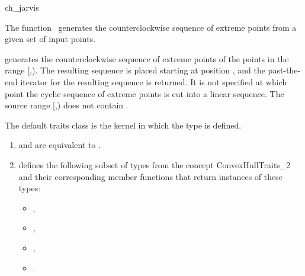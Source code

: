 
\begin{ccRefFunction}{ch_jarvis}  %

\ccDefinition
  
The function \ccRefName\ generates the counterclockwise sequence of extreme
points from a given set of input points.



            {generates the counterclockwise sequence of extreme points
            of the points in the range [,).
            The resulting sequence is placed starting at position
            , and the past-the-end iterator for the resulting
            sequence is returned. It is not specified at which point the
            cyclic sequence of extreme points is cut into a linear sequence.
            \ccPrecond %
            The source range [,) does not contain
            .}

The default traits class  is the kernel in which the
type  is defined.

\begin{enumerate}
   \item    {} and 
            are equivalent to .
   \item    {} defines the following subset of types from
            the concept ConvexHullTraits\_2 and their corresponding member
            functions that return instances of these types:
            \begin{itemize}
                \item {},
		\item {},
                \item {},
                \item {}.
            \end{itemize}
\end{enumerate}



\end{ccRefFunction}
